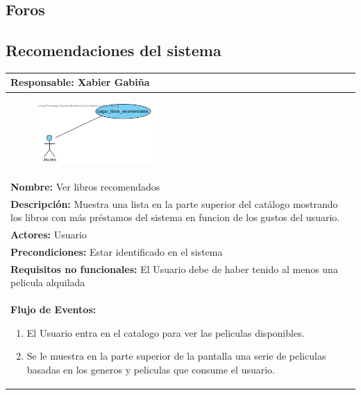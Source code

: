 \documentclass{report}
\begin{document}
        \subsection{Foros}
        \clearpage
        \subsection{Recomendaciones del sistema}
            \begin{center}
                \begin{longtable}{|p{\linewidth}|}
                    \hline
                    \textbf{Responsable:} Xabier Gabiña\\
                    \hline
                    \begin{figure}[H]
                        \centering
                        \includegraphics[width=0.4\textwidth]{./img/casos_uso/recom_lib.png}
                    \end{figure}\\
                    \hline
                    \textbf{Nombre:} Ver libros recomendados\\
                    \hline
                    \textbf{Descripción:} Muestra una lista en la parte superior del catálogo mostrando los libros con más préstamos del sistema en funcion de los gustos del usuario.\\
                    \hline
                    \textbf{Actores:} Usuario\\
                    \hline
                    \textbf{Precondiciones:} Estar identificado en el sistema\\
                    \hline
                    \textbf{Requisitos no funcionales:} El Usuario debe de haber tenido al menos una pelicula alquilada\\
                    \hline
                    \textbf{Flujo de Eventos:}
                    \begin{enumerate}
                        \item El Usuario entra en el catalogo para ver las peliculas disponibles.
                        \item Se le muestra en la parte superior de la pantalla una serie de peliculas basadas en los generos y peliculas que consume el usuario.

\end{enumerate}
\end{longtable}
\end{center}
\end{document}
